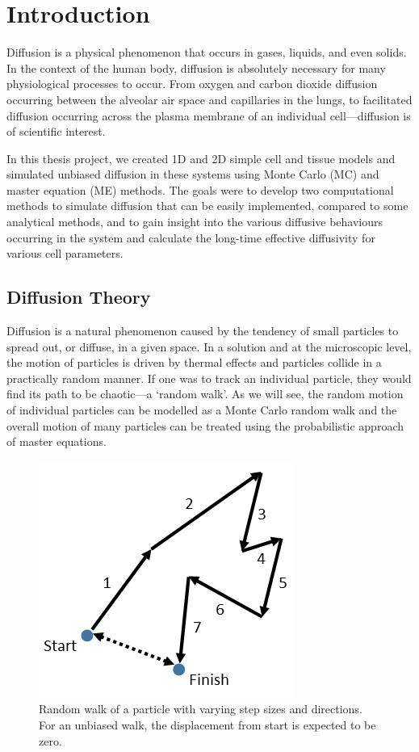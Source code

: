 \chapter{Introduction}
\label{chapter:introduction}

	Diffusion is a physical phenomenon that occurs in gases, liquids, and even solids. In the context of the human body, diffusion is absolutely necessary for many physiological processes to occur. From oxygen and carbon dioxide diffusion occurring between the alveolar air space and capillaries in the lungs, to facilitated diffusion occurring across the plasma membrane of an individual cell---diffusion is of scientific interest.
	
	In this thesis project, we created 1D and 2D simple cell and tissue models and simulated unbiased diffusion in these systems using Monte Carlo (MC) and master equation (ME) methods. The goals were to develop two computational methods to simulate diffusion that can be easily implemented, compared to some analytical methods, and to gain insight into the various diffusive behaviours occurring in the system and calculate the long-time effective diffusivity for various cell parameters.
	
\section{Diffusion Theory}
\label{sec:intro-diffusion}
	Diffusion is a natural phenomenon caused by the tendency of small particles to spread out, or diffuse, in a given space. In a solution and at the microscopic level, the motion of particles is driven by thermal effects and particles collide in a practically random manner. If one was to track an individual particle, they would find its path to be chaotic---a `random walk'. As we will see, the random motion of individual particles can be modelled as a Monte Carlo random walk and the overall motion of many particles can be treated using the probabilistic approach of master equations.
	
	\begin{figure}[h]
		\centering
		\includegraphics[width=0.5\linewidth]{../images/random-walk}
		\caption[Simple random walk]{Random walk of a particle with varying step sizes and directions. For an unbiased walk, the displacement from start is expected to be zero.}
		\label{fig:random-walk}
	\end{figure}
	
